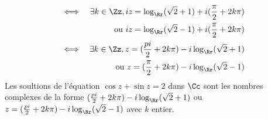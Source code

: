 {\begin{enumerate}
{\begin{eqnarray*}
 &\iff&\exists k\in\Zz, iz=\log_\Rr(\sqrt{2}+1)+i(\frac{\pi}{2}+2k\pi) \\&& \textrm { ou } iz=\log_\Rr(\sqrt{2}-1)+i(\frac{\pi}{2}+2k\pi)\\
 &\iff&\exists k\in\Zz, z=(\frac{pi}{2}+2k\pi)-i\log_\Rr(\sqrt{2}+1) \\&& \textrm { ou } z=(\frac{\pi}{2}+2k\pi)-i\log_\Rr(\sqrt{2}-1)
\end{eqnarray*}
Les soultions de l'équation $\cos z+\sin z=2$ dans $\Cc$ sont les nombres complexes de la forme
$(\frac{pi}{2}+2k\pi)-i\log_\Rr(\sqrt{2}+1)$ ou $z=(\frac{pi}{2}+2k\pi)-i\log_\Rr(\sqrt{2}-1)$
avec $k$ entier.}
\end{enumerate}
}
